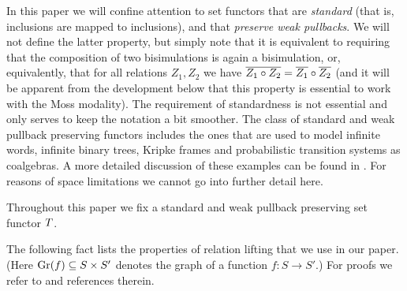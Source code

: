 \documentclass{book}
\begin{document}
In this paper we will confine attention to set functors that are
\emph{standard} (that is, inclusions are mapped to inclusions), and
that \emph{preserve weak pullbacks}.  We will not define the latter
property, but simply note that it is equivalent to requiring that the
composition of two bisimulations is again a bisimulation, or,
equivalently, that for all relations $Z_1,Z_2$ we have
$\overline{Z_1\circ Z_2}=\overline{Z_1}\circ\overline{Z_2}$ (and it will be
apparent from the development below that this property is essential to
work with the Moss modality).  The requirement of standardness is not
essential and only serves to keep the notation a bit smoother.  The
class of standard and weak pullback preserving functors includes the
ones that are used to model infinite words, infinite binary trees,
Kripke frames and probabilistic transition systems as coalgebras.  A
more detailed discussion of these examples can be found in
\cite{kupk:coal08}.  For reasons of space limitations we cannot go
into further detail here.

\begin{convention}
Throughout this paper we fix a standard and weak pullback preserving set
functor $T$.
\end{convention}

The following fact lists the properties of relation lifting that we use in our
paper. 
(Here $\mathrm{Gr}(f) \subseteq S \times S'$ denotes the graph of a function $f:
S \to S'$.)
For proofs we refer to \cite{moss:cl}
and references therein.
\end{document}
